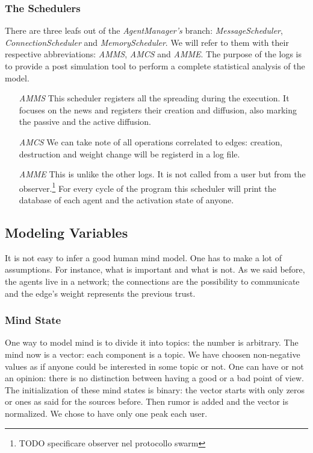 \subsubsection{The Schedulers}\label{subsubsec:schedulers}
There are three leafs out of the \textit{AgentManager's} branch:
\textit{MessageScheduler}, \textit{ConnectionScheduler} and
\textit{MemoryScheduler}. We will refer to them with their
respective abbreviations: \textit{AMMS}, \textit{AMCS} and \textit{AMME}.
The purpose of the logs is to provide a post simulation tool to perform
a complete statistical analysis of the model. 
\begin{itemize}
\item [\textit{AMMS}] This scheduler registers all the spreading during the
  execution. It focuses on the news and registers their creation and
  diffusion, also marking the passive and the active diffusion.
\item [\textit{AMCS}] We can take note of all operations correlated
  to edges: creation, destruction and weight change will
  be registerd in a log file.
\item [\textit{AMME}] This is unlike the other logs. It is not
  called from a user but from the observer.\footnote{TODO specificare
  observer nel protocollo swarm} For every cycle of the program
  this scheduler will print the database of each agent and the activation
  state of anyone.
\end{itemize}

\subsection{Modeling Variables}\label{subsec:variables}
It is not easy to infer a good human mind model. One has to make
a lot of assumptions. For instance, what is important and what is not.
As we said before, the agents live in a network; the connections are the
possibility to communicate and the edge's weight represents the previous
trust.

\subsubsection{Mind State}\label{subsubsec:mindstate}
One way to model mind is to divide it into topics: the number is arbitrary.
The mind now is a vector: each component is a topic. We have choosen
non-negative values as if anyone could be interested in some topic or not.
One can have or not an opinion: there is no distinction between
having a good or a bad point of view.
The initialization of these mind states is binary: the vector starts
with only zeros or ones as said for the sources before. Then rumor is added
and the vector is normalized. We chose to have only one peak each user.

